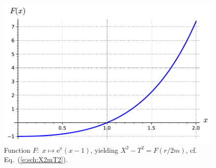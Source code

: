 \begin{figure}
\centerline{\includegraphics[height=0.32\textheight]{max_X2mT2.pdf}}
\caption[]{\label{f:max:X2mT2} \footnotesize
Function $F:\; x\mapsto \mathrm{e}^{x}(x-1)$, yielding
$X^2-T^2 = F(r/2m)$, cf. Eq.~(\ref{e:sch:X2mT2}).}
\end{figure}

